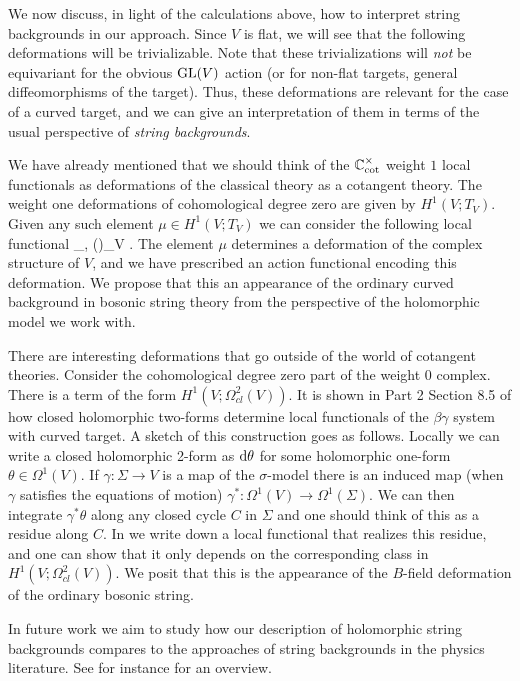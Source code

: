 We now discuss, in light of the calculations above, how to interpret string backgrounds in our approach. 
Since $V$ is flat,
we will see that the following deformations will be trivializable. 
Note that these trivializations will {\em not} be equivariant for the obvious ${\rm GL}(V)$ action (or for non-flat targets, general diffeomorphisms of the target). 
Thus, these deformations are relevant for the case of a curved target, and we can give an interpretation of them in terms of the usual perspective of {\em string backgrounds}. 

We have already mentioned  that we should think of the $\mathbb C^\times_{\rm cot}$ weight $1$ local functionals as deformations of the classical theory as a cotangent theory.
The weight one deformations of cohomological degree zero are given by $H^1(V ; T_V)$. 
Given any such element $\mu \in H^1(V ; T_V)$ we can consider the following local functional
\ben
\int_\Sigma \<\beta, \mu(\gamma)\>_V .
\een 
The element $\mu$ determines a deformation of the complex structure of $V$, and we have prescribed an action functional encoding this deformation. 
We propose that this an appearance of the ordinary curved background in bosonic string theory from the perspective of the holomorphic model we work with.

There are interesting deformations that go outside of the world of cotangent theories. 
Consider the cohomological degree zero part of the weight 0 complex. 
There is a term of the form $H^1(V ; \Omega^2_{cl}(V))$.
It is shown in Part 2 Section 8.5 of \cite{GGW} how closed holomorphic two-forms determine local functionals of the $\beta\gamma$ system with curved target. 
A sketch of this construction goes as follows.
Locally we can write a closed holomorphic 2-form as ${\rm d} \theta$ for some holomorphic one-form $\theta \in \Omega^1(V)$. 
If $\gamma : \Sigma \to V$ is a map of the $\sigma$-model there is an induced map (when $\gamma$ satisfies the equations of motion) $\gamma^* : \Omega^1(V) \to \Omega^1(\Sigma)$. 
We can then integrate $\gamma^* \theta$ along any closed cycle $C$ in $\Sigma$ and one should think of this as a residue along $C$. 
In \cite{GGW} we write down a local functional that realizes this residue, and one can show that it only depends on the corresponding class in $H^1(V ; \Omega^2_{cl}(V))$. 
We posit that this is the appearance of the $B$-field deformation of the ordinary bosonic string. 

In future work we aim to study how our description of holomorphic string backgrounds compares to the approaches of string backgrounds in the physics literature. 
See for instance \cite{CFMP} for an overview.


